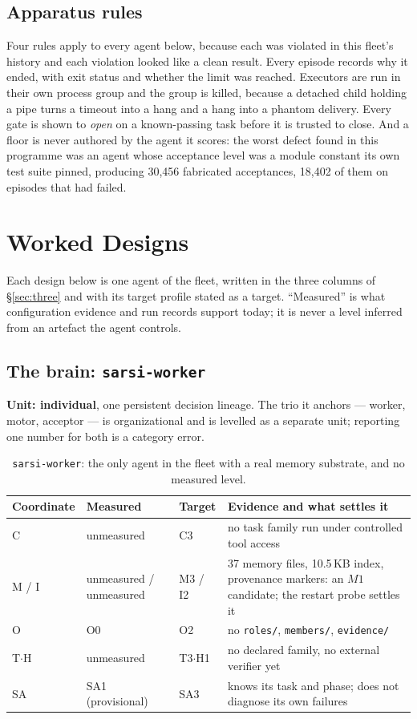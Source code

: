 \documentclass[11pt]{article}
\theoremstyle{definition}
\begin{document}
\subsection{Apparatus rules}

Four rules apply to every agent below, because each was violated in this fleet's history and each violation looked like a clean result. Every episode records why it ended, with exit status and whether the limit was reached. Executors are run in their own process group and the group is killed, because a detached child holding a pipe turns a timeout into a hang and a hang into a phantom delivery. Every gate is shown to \emph{open} on a known-passing task before it is trusted to close. And a floor is never authored by the agent it scores: the worst defect found in this programme was an agent whose acceptance level was a module constant its own test suite pinned, producing 30,456 fabricated acceptances, 18,402 of them on episodes that had failed.
\section{Worked Designs}\label{sec:designs}

Each design below is one agent of the fleet, written in the three columns of \S\ref{sec:three} and with its target profile stated as a target. ``Measured'' is what configuration evidence and run records support today; it is never a level inferred from an artefact the agent controls.

\subsection{The brain: \texttt{sarsi-worker}}\label{sec:worker}

\textbf{Unit: individual}, one persistent decision lineage. The trio it anchors --- worker, motor, acceptor --- is organizational and is levelled as a separate unit; reporting one number for both is a category error.

\begin{table}[H]
\centering\small
\begin{tabularx}{\textwidth}{@{}lllY@{}}
\toprule
Coordinate & Measured & Target & Evidence and what settles it \\
\midrule
C & unmeasured & C3 & no task family run under controlled tool access \\
M / I & unmeasured / unmeasured & M3 / I2 & 37 memory files, 10.5\,KB index, provenance markers: an $M1$ candidate; the restart probe settles it \\
O & O0 & O2 & no \texttt{roles/}, \texttt{members/}, \texttt{evidence/} \\
T$\cdot$H & unmeasured & T3$\cdot$H1 & no declared family, no external verifier yet \\
SA & SA1 (provisional) & SA3 & knows its task and phase; does not diagnose its own failures \\
\bottomrule
\end{tabularx}
\caption{\texttt{sarsi-worker}: the only agent in the fleet with a real memory substrate, and no measured level.}
\label{tab:worker}
\end{table}
\end{document}
